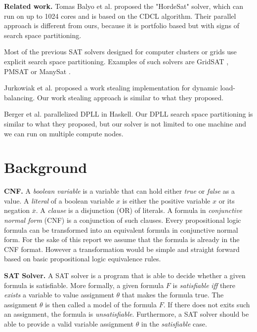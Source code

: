 \documentclass[letterpaper]{article}
\newcommand{\mypar}[1]{{\bf #1.}}
\begin{document}
\mypar{Related work}
Tomas Balyo et al. proposed the "HordeSat" solver, which can run on up to 1024 cores and is based on the CDCL algorithm.
Their parallel approach is different from ours, because it is portfolio based but with signs of search space partitioning. \cite{hordesat}

Most of the previous SAT solvers designed for computer clusters or grids use explicit search space partitioning.
Examples of such solvers are GridSAT \cite{gridsat}, PMSAT \cite{pmsat} or ManySat \cite{manysat}.

Jurkowiak et al. proposed a work stealing implementation for dynamic load-balancing. \cite{stealing}
Our work stealing approach is similar to what they proposed.

Berger et al. parallelized DPLL in Haskell. \cite{dpll_haskell}
Our DPLL search space partitioning is similar to what they proposed, but our solver is not limited to one machine and we can run on multiple compute nodes.

\section{Background}\label{sec:background}

\mypar{CNF}
A \textit{boolean variable} is a variable that can hold either \textit{true} or \textit{false} as a value.
A \textit{literal} of a boolean variable $x$ is either the positive variable $x$ or its negation $\overline{x}$.
A \textit{clause} is a disjunction (OR) of literals.
A formula in \textit{conjunctive normal form} (CNF) is a conjunction of such clauses.
Every propositional logic formula can be transformed into an equivalent formula in conjunctive normal form.
For the sake of this report we assume that the formula is already in the CNF format.
However a transformation would be simple and straight forward based on basic propositional logic equivalence rules.

\mypar{SAT Solver}
A SAT solver is a program that is able to decide whether a given formula is satisfiable.
More formally, a given formula $F$ is \textit{satisfiable} \textit{iff} there \textit{exists} a variable to value assignment $\theta$ that makes the formula true.
The assignment $\theta$ is then called a model of the formula $F$.
If there does not exits such an assignment, the formula is \textit{unsatisfiable}.
Furthermore, a SAT solver should be able to provide a valid variable assignment $\theta$ in the \textit{satisfiable} case.
\end{document}
